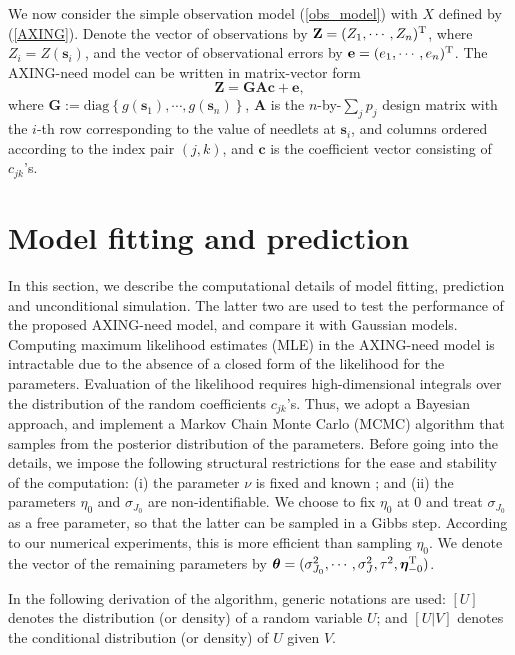 \documentclass[aoas,preprint]{imsart}
\numberwithin{equation}{section}
\theoremstyle{plain}
\begin{document}
We now consider the simple observation model (\ref{obs_model}) with $X$ defined by (\ref{AXING}). Denote the vector of observations by $\mathbf{Z}=(Z_1, \cdots, Z_n)^{\rm T}$, where $Z_i=Z(\mathbf{s}_i)$, and the vector of observational errors by $\mathbf{e}=(e_1, \cdots, e_n)^{\rm T}$. The AXING-need model can be written in matrix-vector form 
\begin{equation}\label{AXING_matrix}
\textbf{Z}=\textbf{G} \textbf{A} \textbf{c}+\textbf{e},
\end{equation}
where $\textbf{G}:=\mbox{diag} \left\{ g(\textbf{s}_1), \cdots, g(\textbf{s}_n) \right\}$, $\mathbf{A}$ is the $n$-by-$\sum_j p_j$ design matrix with the $i$-th row corresponding to the value of needlets at $\mathbf{s}_i$, and columns ordered according to the index pair $(j, k)$, and $\mathbf{c}$ is the coefficient vector consisting of $c_{jk}$'s.

\section{Model fitting and prediction}\label{sec:comp_detail}

In this section, we describe the computational details of model fitting, prediction and unconditional simulation. The latter two are used to test the performance of the proposed AXING-need model, and compare it with Gaussian models. Computing maximum likelihood estimates (MLE) in the AXING-need model is intractable due to the absence of a closed form of the likelihood for the parameters. Evaluation of the likelihood requires high-dimensional integrals over the distribution of the random coefficients $c_{jk}$'s. Thus, we adopt a Bayesian approach, and implement a Markov Chain Monte Carlo (MCMC) algorithm that samples from the posterior distribution of the parameters. Before going into the details, we impose the following structural restrictions for the ease and stability of the computation:
(i) the parameter $\nu$ is fixed and known \citep{Wolfe-04}; and (ii) the parameters $\eta_0$ and $\sigma_{J_0}$ are non-identifiable. We choose to fix $\eta_0$ at 0 and treat $\sigma_{J_0}$ as a free parameter, so that the latter can be sampled in a Gibbs step. According to our numerical experiments, this is more efficient than sampling $\eta_0$. We denote the vector of the remaining parameters by $\bm{\theta}=(\sigma_{J_0}^2, \cdots, \sigma_{J}^2, \tau^2, \bm{\eta}_{-0}^{\rm T})$.

In the following derivation of the algorithm, generic notations are used: $[U]$ denotes the distribution (or density) of a random variable $U$; and $[U|V]$ denotes the conditional distribution (or density) of $U$ given $V$.
\end{document}
